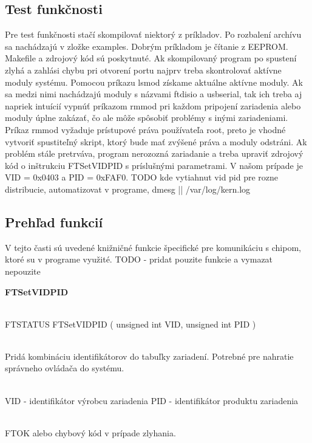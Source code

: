 \subsection{Test funkčnosti}
Pre test funkčnosti stačí skompilovať niektorý z príkladov. Po rozbalení archívu sa nachádzajú v zložke examples.
Dobrým príkladom je čítanie z EEPROM. Makefile a zdrojový kód sú poskytnuté. Ak skompilovaný program po spustení zlyhá 
a zahlási chybu pri otvorení portu najprv treba skontrolovať aktívne moduly systému. Pomocou príkazu lsmod získame
aktuálne aktívne moduly. Ak sa medzi nimi nachádzajú moduly s názvami ftdi\textunderscore sio a usbserial, tak ich treba aj napriek 
intuícií vypnúť príkazom rmmod pri každom pripojení zariadenia alebo moduly úplne zakázať, čo ale môže spôsobiť problémy
s inými zariadeniami. Príkaz rmmod vyžaduje prístupové práva používateľa root, preto je vhodné vytvoriť spustiteľný skript,
ktorý bude mať zvýšené práva a moduly odstráni. Ak problém stále pretrváva, program nerozozná zariadanie a treba upraviť
zdrojový kód o inštrukciu FT\textunderscore SetVIDPID s príslušnými parametrami. V našom prípade je VID = 0x0403 a PID = 0xFAF0. 
TODO kde vytiahnut vid pid pre rozne distribucie, automatizovat v programe, dmesg || /var/log/kern.log


\subsection{Prehľad funkcií}
V tejto časti sú uvedené knižničné funkcie špecifické pre komunikáciu s chipom, ktoré su v programe využité. 
TODO -  pridat pouzite funkcie a vymazat nepouzite \newline

\textbf{\large FT\textunderscore SetVIDPID}
\begin{description} \itemsep1pt \parskip0pt 
  \item[Definícia] \hfill \\	FT\textunderscore STATUS FT\textunderscore SetVIDPID ( unsigned int VID, unsigned int PID )
  \item[Popis] 	\hfill \\ Pridá kombináciu identifikátorov do tabuľky zariadení. Potrebné pre nahratie správneho ovládača do systému.
  \item[Parametre]  \hfill \\ VID - identifikátor výrobcu zariadenia \newline PID - identifikátor produktu zariadenia 
  \item[Návratová hodnota] \hfill \\ FT\textunderscore OK alebo chybový kód v prípade zlyhania.
\end{description} 
\hfill \break

